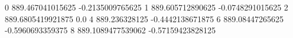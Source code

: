 0 889.467041015625 -0.2135009765625
1 889.605712890625 -0.0748291015625
2 889.6805419921875 0.0
4 889.236328125 -0.4442138671875
6 889.08447265625 -0.5960693359375
8 889.1089477539062 -0.57159423828125
